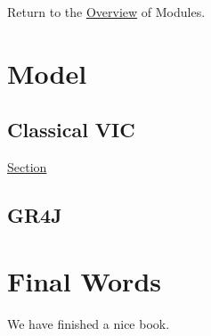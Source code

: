 \documentclass[
]{book}
\begin{document}
Return to the \protect\hyperlink{module}{Overview} of Modules.

\hypertarget{model}{%
\chapter{Model}\label{model}}

\hypertarget{classical-vic}{%
\section{Classical VIC}\label{classical-vic}}

\protect\hyperlink{ReferenceET}{Section}

\hypertarget{gr4j}{%
\section{GR4J}\label{gr4j}}

\hypertarget{final-words}{%
\chapter{Final Words}\label{final-words}}

We have finished a nice book.

  
\end{document}
